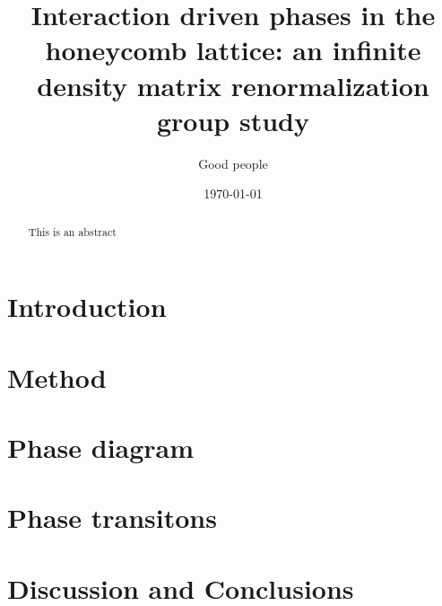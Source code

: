 \documentclass[aps,prx,10pt,twocolumn,floatfix,superscriptaddress,showpacs,numerical,footinbib]{revtex4-1}
\begin{document}
%
\title{Interaction driven phases in the honeycomb lattice: an infinite density matrix renormalization group study}
%
\author{Good people}
%
\date{\today}
%
\begin{abstract}
%
This is an abstract
%
\end{abstract}
%
\maketitle
%

\section{Introduction}
\section{Method}
\section{Phase diagram}
\section{Phase transitons}
\section{Discussion and Conclusions}
\end{document}
